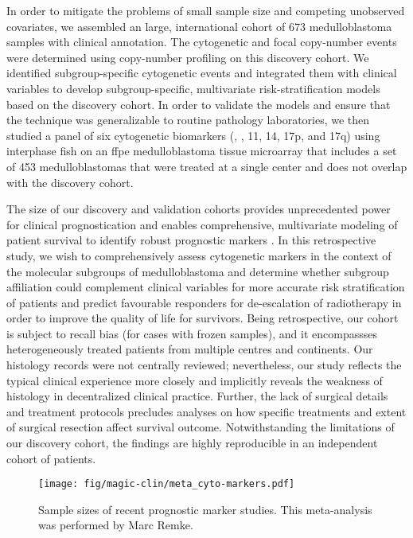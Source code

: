 In order to mitigate the problems of small sample size and competing unobserved covariates, we assembled an large, international cohort of 673 medulloblastoma samples with clinical annotation. The cytogenetic and focal copy-number events were determined using copy-number profiling on this discovery cohort. We identified subgroup-specific cytogenetic events and integrated them with clinical variables to develop subgroup-specific, multivariate risk-stratification models based on the discovery cohort. In order to validate the models and ensure that the technique was generalizable to routine pathology laboratories, we then studied a panel of six cytogenetic biomarkers (, , 11, 14, 17p, and 17q) using interphase \gls{fish} on an \gls{ffpe} medulloblastoma tissue microarray that includes a set of 453 medulloblastomas that were treated at a single center and does not overlap with the discovery cohort.

The size of our discovery and validation cohorts provides unprecedented power for clinical prognostication and enables comprehensive, multivariate modeling of patient survival to identify robust prognostic markers . In this retrospective study, we wish to comprehensively assess cytogenetic markers in the context of the molecular subgroups of medulloblastoma and determine whether subgroup affiliation could complement clinical variables for more accurate risk stratification of patients and predict favourable responders for de-escalation of radiotherapy in order to improve the quality of life for survivors. Being retrospective, our cohort is subject to recall bias (for cases with frozen samples), and it encompassses heterogeneously treated patients from multiple centres and continents. Our histology records were not centrally reviewed; nevertheless, our study reflects the typical clinical experience more closely and implicitly reveals the weakness of histology in decentralized clinical practice. Further, the lack of surgical details and treatment protocols precludes analyses on how specific treatments and extent of surgical resection affect survival outcome. Notwithstanding the limitations of our discovery cohort, the findings are highly reproducible in an independent cohort of patients.

\begin{SCfigure}[5][t]
	\texttt{[image: fig/magic-clin/meta\_cyto-markers.pdf]}
	\caption[Sample sizes of recent prognostic marker studies]
	{
	Sample sizes of recent prognostic marker studies.
	This meta-analysis was performed by Marc Remke.
	}
	\label{fig:meta_cyto-markers}
\end{SCfigure}

